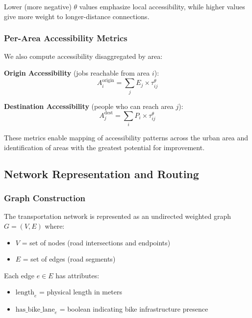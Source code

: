 \documentclass[12pt,a4paper]{article}
\begin{document}


Lower (more negative) $\theta$ values emphasize local accessibility, while higher values give more weight to longer-distance connections.

\subsubsection{Per-Area Accessibility Metrics}

We also compute accessibility disaggregated by area:

\textbf{Origin Accessibility} (jobs reachable from area $i$):
\begin{equation}
A_i^{\text{origin}} = \sum_j E_j \times \tau_{ij}^{\theta}
\label{eq:origin_accessibility}
\end{equation}

\textbf{Destination Accessibility} (people who can reach area $j$):
\begin{equation}
A_j^{\text{dest}} = \sum_i P_i \times \tau_{ij}^{\theta}
\label{eq:dest_accessibility}
\end{equation}

These metrics enable mapping of accessibility patterns across the urban area and identification of areas with the greatest potential for improvement.

\subsection{Network Representation and Routing}

\subsubsection{Graph Construction}

The transportation network is represented as an undirected weighted graph $G = (V, E)$ where:
\begin{itemize}
    \item $V$ = set of nodes (road intersections and endpoints)
    \item $E$ = set of edges (road segments)
\end{itemize}

Each edge $e \in E$ has attributes:
\begin{itemize}
    \item $\text{length}_e$ = physical length in meters
    \item $\text{has\_bike\_lane}_e$ = boolean indicating bike infrastructure presence
\end{itemize}
\end{document}
